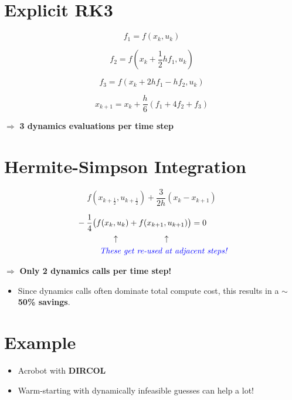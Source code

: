 \documentclass[11pt]{article}
\begin{document}
\section*{Explicit RK3}

\begin{equation*}
    f_1 = f(x_k, u_k)
\end{equation*}

\begin{equation*}
    f_2 = f(x_k + \frac{1}{2} h f_1, u_k)
\end{equation*}

\begin{equation*}
    f_3 = f(x_k + 2h f_1 - h f_2, u_k)
\end{equation*}

\begin{equation*}
    x_{k+1} = x_k + \frac{h}{6} (f_1 + 4 f_2 + f_3)
\end{equation*}

$\Rightarrow$ \textbf{3 dynamics evaluations per time step}

\section*{Hermite-Simpson Integration}

\begin{equation*}
    f(x_{k+\frac{1}{2}}, u_{k+\frac{1}{2}}) + \frac{3}{2h} (x_k - x_{k+1})
\end{equation*}

\begin{align*}
    &- \frac{1}{4} \big( f(x_k, u_k) + f(x_{k+1}, u_{k+1}) \big) = 0 
    \\
    &\hspace{15mm}\uparrow \hspace{20mm}\uparrow
    \\
&\hspace{10mm}\textcolor{blue}{\textit{These get re-used at adjacent steps!}}
\end{align*}


$\Rightarrow$ \textbf{Only 2 dynamics calls per time step!}

\begin{itemize}
    \item Since dynamics calls often dominate total compute cost, this results in a \textbf{$\sim$50\% savings}.
\end{itemize}

\section*{Example}

\begin{itemize}
    \item Acrobot with \textbf{DIRCOL}
    \item Warm-starting with dynamically infeasible guesses can help a lot!
\end{itemize}
\end{document}
